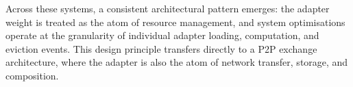 Across these systems, a consistent architectural pattern emerges: the adapter weight is
treated as the atom of resource management, and system optimisations operate at the
granularity of individual adapter loading, computation, and eviction events. This
design principle transfers directly to a P2P exchange architecture, where the adapter is also
the atom of network transfer, storage, and composition.